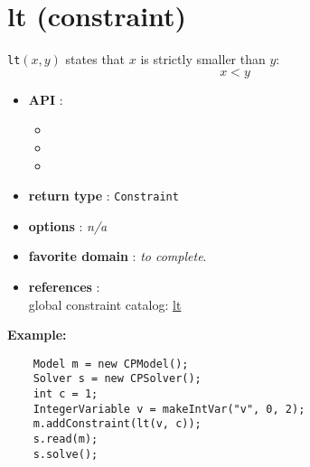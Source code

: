 \label{lt}
\hypertarget{lt}{}

\section{lt (constraint)}\label{lt:ltconstraint}\hypertarget{lt:ltconstraint}{}
\begin{notedef}
  \texttt{lt}$(x,y)$ states that $x$ is strictly smaller than $y$:
$$x<y$$
\end{notedef}

\begin{itemize}
	\item \textbf{API} :
	\begin{itemize}
		\item {}
		\item {}
		\item {}
	\end{itemize}
	\item \textbf{return type} : \texttt{Constraint}
	\item \textbf{options} : \emph{n/a}
	\item \textbf{favorite domain} : \emph{to complete}.
	\item \textbf{references} :\\
      global constraint catalog: \href{http://www.emn.fr/x-info/sdemasse/gccat/Clt.html}{lt}
\end{itemize}

\textbf{Example:}
\begin{lstlisting}
	Model m = new CPModel();
	Solver s = new CPSolver();
	int c = 1;
	IntegerVariable v = makeIntVar("v", 0, 2);
	m.addConstraint(lt(v, c));
	s.read(m);
	s.solve();
\end{lstlisting}
